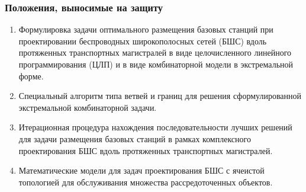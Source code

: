 \begin{frame}
    \setcounter{framenumber}{1}
    \maketitle
\end{frame}

\begin{frame}
    \frametitle{Положения, выносимые на защиту}
    \begin{enumerate} %
        \item Формулировка задачи оптимального размещения базовых станций при проектировании беспроводных широкополосных сетей (БШС) вдоль протяженных транспортных магистралей в виде целочисленного линейного программирования (ЦЛП) и в виде комбинаторной модели в экстремальной форме.
   
        \item Специальный алгоритм типа ветвей и границ для решения сформулированной экстремальной комбинаторной задачи.
        \item Итерационная процедура нахождения последовательности лучших решений для задачи размещения базовых станций в рамках комплексного проектирования БШС вдоль протяженных транспортных магистралей.
        \item Математические модели для задач проектирования БШС с ячеистой топологией для обслуживания множества рассредоточенных объектов.
      \end{enumerate}
\end{frame}





